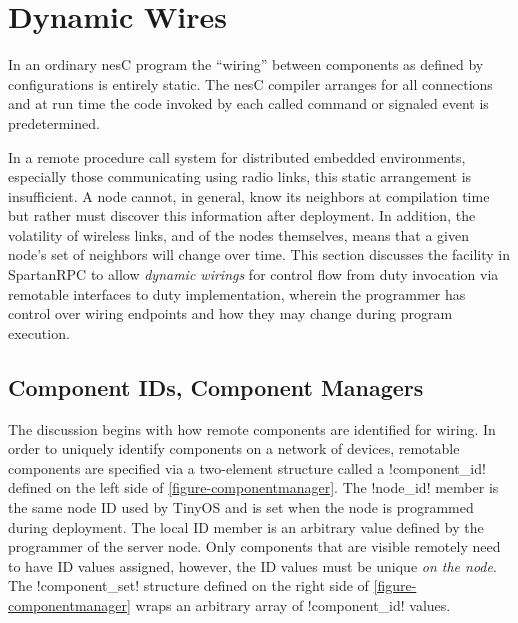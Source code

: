 \section{Dynamic Wires}
\label{section-dynamic-wires}

In an ordinary nesC program the ``wiring'' between components as defined by configurations is
entirely static. The nesC compiler arranges for all connections and at run time the code invoked
by each called command or signaled event is predetermined.

In a remote procedure call system for distributed embedded environments, especially those
communicating using radio links, this static arrangement is insufficient. A node cannot, in
general, know its neighbors at compilation time but rather must discover this information after
deployment. In addition, the volatility of wireless links, and of the nodes themselves, means
that a given node's set of neighbors will change over time.  This section discusses the
facility in SpartanRPC to allow \emph{dynamic wirings} for control flow from duty invocation via
remotable interfaces to duty implementation, wherein the programmer has control over wiring
endpoints and how they may change during program execution.

\subsection{Component IDs, Component Managers}
\label{section-componentmanager}

The discussion begins with how remote components are identified for wiring. In order to uniquely
identify components on a network of devices, remotable components are specified via a
two-element structure called a !component_id! defined on the left side of
\autoref{figure-componentmanager}. The !node_id! member is the same node ID used by TinyOS and
is set when the node is programmed during deployment. The local ID member is an arbitrary value
defined by the programmer of the server node. Only components that are visible remotely need to
have ID values assigned, however, the ID values must be unique \emph{on the node}. The
!component_set! structure defined on the right side of \autoref{figure-componentmanager} wraps
an arbitrary array of !component_id! values.
 
